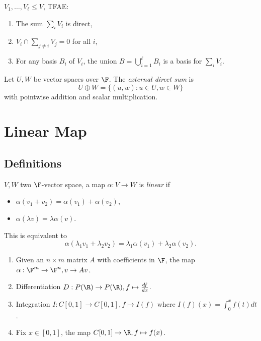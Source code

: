 \documentclass[a4paper]{article}
\theoremstyle{definition}
\begin{document}
\begin{ex}
  \(V_1,\ldots, V_\ell \leq V\), TFAE:
  \begin{enumerate}
  \item The sum \(\sum_i V_i\) is direct,
  \item \(V_i \cap \sum_{j\neq i}V_j = 0\) for all \(i\),
  \item For any basis \(B_i\) of \(V_i\), the union \(B=\bigcup_{i=1}^\ell B_i\) is a basis for \(\sum_i V_i\).
  \end{enumerate}
\end{ex}

\begin{definition}
  Let \(U, W\) be vector spaces over \(\F\). The \emph{external direct sum} is
  \[
    U\oplus W = \{(u,w): u\in U, w\in W\}
  \]
  with pointwise addition and scalar multiplication.
\end{definition}

\section{Linear Map}

\subsection{Definitions}

\begin{definition}
  \(V, W\) two \(\F\)-vector space, a map \(\alpha: V\to W\) is \emph{linear} if
  \begin{itemize}
  \item \(\alpha(v_1 + v_2) = \alpha(v_1) + \alpha(v_2)\),
  \item \(\alpha(\lambda v) = \lambda \alpha(v)\).
  \end{itemize}
  This is equivalent to
  \[
\alpha(\lambda_1v_1+ \lambda_2v_2) = \lambda_1\alpha(v_1) + \lambda_2\alpha(v_2).
  \]
\end{definition}

\begin{eg}\leavevmode
  \begin{enumerate}
  \item Given an \(n\times m\) matrix \(A\) with coefficients in \(\F\), the map \(\alpha: \F^m\to \F^n, v\to Av\).
  \item Differentiation \(D: P(\R) \to P(\R), f\mapsto \frac{df}{dx}\).
  \item Integration \(I: C[0,1] \to C[0,1], f \mapsto I(f)\) where \(I(f)(x) = \int_0^x f(t)dt\).
  \item Fix \(x\in [0,1]\), the map \(C[0,1]\to \R, f\mapsto f(x)\).
  \end{enumerate}
\end{eg}
\end{document}
